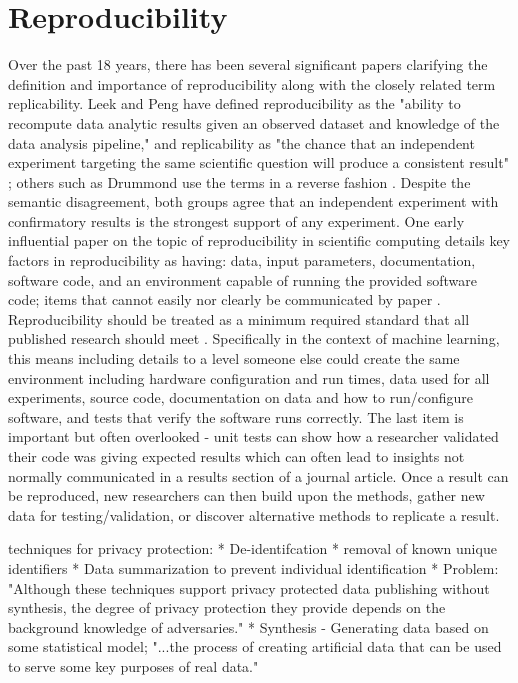  \section{Reproducibility}
 Over the past 18 years, there has been several significant papers clarifying the definition and importance of reproducibility along with the closely related term replicability. Leek and Peng have defined reproducibility as the "ability to recompute data analytic results given an observed dataset and knowledge of the data analysis pipeline," and replicability as "the chance that an independent experiment targeting the same scientific question will produce a consistent result" \cite{leek_opinion_2015}; others such as Drummond use the terms in a reverse fashion \cite{drummond_replicability_2009}. Despite the semantic disagreement, both groups agree that an independent experiment with confirmatory results is the strongest support of any experiment. One early influential paper on the topic of reproducibility in scientific computing details key factors in reproducibility as having: data, input parameters, documentation, software code, and an environment capable of running the provided software code; items that cannot easily nor clearly be communicated by paper \cite{schwab_making_2000}. Reproducibility should be treated as a minimum required standard that all published research should meet \cite{peng_reproducible_2006}. Specifically in the context of machine learning, this means including details to a level someone else could create the same environment including hardware configuration and run times, data used for all experiments, source code, documentation on data and how to run/configure software, and tests that verify the software runs correctly. The last item is important but often overlooked - unit tests can show how a researcher validated their code was giving expected results which can often lead to insights not normally communicated in a results section of a journal article. Once a result can be reproduced, new researchers can then build upon the methods, gather new data for testing/validation, or discover alternative methods to replicate a result.
 
 techniques for privacy protection:
 * De-identifcation
   * removal of known unique identifiers
   * Data summarization to prevent individual identification
   * Problem: "Although these techniques support privacy protected data publishing without synthesis, the degree of privacy protection they provide depends on the background knowledge of adversaries."
 * Synthesis - Generating data based on some statistical model; "...the process of creating artificial data that can be used to serve some key purposes of real data."
 
